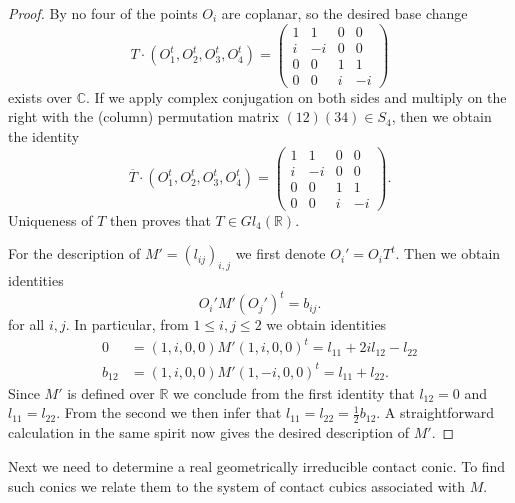 \documentclass[a4paper,10pt]{amsart}
\theoremstyle{definition}
\theoremstyle{plain}
\newcommand{\C}{{\mathbb C}}
\newcommand{\R}{{\mathbb R}}
\begin{document}
\begin{proof}
    By \cite[Proposition 6.3.2]{dolgachev} no four of the points $O_i$ are coplanar, so the desired base change
    \begin{equation*}
        T\cdot(O_1^t, O_2^t, O_3^t, O_4^t) = \begin{pmatrix}
            1 & 1 & 0 & 0 \\
            i & -i & 0 & 0 \\
            0 & 0 & 1 & 1 \\
            0 & 0 & i & -i
        \end{pmatrix}
    \end{equation*}
    exists over $\C$.
    If we apply complex conjugation on both sides and multiply on the right with the (column) permutation matrix $(12)(34) \in S_4$, then we obtain the identity
    \begin{equation*}
        \overline{T}\cdot(O_1^t, O_2^t, O_3^t, O_4^t) = \begin{pmatrix}
            1 & 1 & 0 & 0 \\
            i & -i & 0 & 0 \\
            0 & 0 & 1 & 1 \\
            0 & 0 & i & -i
        \end{pmatrix}.
    \end{equation*}
    Uniqueness of $T$ then proves that $T \in Gl_4(\R)$.

    For the description of $M' = (l_{ij})_{i,j}$ we first denote $O_i' = O_i T^t$. Then we obtain identities
    \begin{equation*}
        O_i' M' (O_j')^t = b_{ij}.
    \end{equation*}
    for all $i,j$. In particular, from $1 \leq i,j \leq 2$ we obtain identities
    \begin{align*}
        0 &= (1,i,0,0)M'(1,i,0,0)^t = l_{11} + 2i l_{12} - l_{22} \\
        b_{12} &= (1,i,0,0)M'(1,-i,0,0)^t = l_{11} + l_{22}.
    \end{align*}
    Since $M'$ is defined over $\R$ we conclude from the first identity that $l_{12} = 0$ and $l_{11} = l_{22}$. From the second we then infer that $l_{11} = l_{22} = \frac{1}{2}b_{12}$. A straightforward calculation in the same spirit now gives the desired description of $M'$.
\end{proof}

Next we need to determine a real geometrically irreducible contact conic. To find such conics we relate them to the system of contact cubics associated with $M$.
\end{document}
